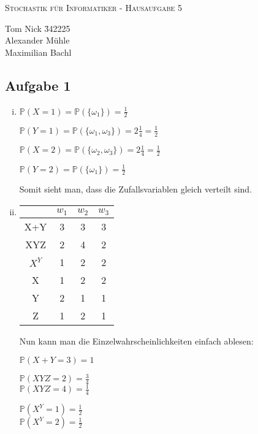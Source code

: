 \documentclass[10pt,a4paper,parskip=half]{scrartcl}
\begin{document}
\begin{center}
\textsc{\Large{Stochastik für Informatiker - Hausaufgabe 5}} \\
\end{center}
\begin{tabbing}
Tom Nick \hspace{1.4cm}\= 342225\\
Alexander Mühle\\
Maximilian Bachl
\end{tabbing}
\subsection*{Aufgabe 1}

\begin{enumerate}[(i)]
\item $\mathbb P (X=1) = \mathbb P(\{\omega_1\}) = \frac 1 2$

$\mathbb P (Y=1) = \mathbb P(\{\omega_1, \omega_3\}) = 2\frac 1 4 = \frac 1 2$

$\mathbb P (X=2) = \mathbb P(\{\omega_2, \omega_3\}) = 2\frac 1 4 = \frac 1 2$

$\mathbb P (Y=2) = \mathbb P(\{\omega_1\}) = \frac 1 2$

Somit sieht man, dass die Zufallsvariablen gleich verteilt sind.

\item\leavevmode\vadjust{\vspace{-\baselineskip}}\newline
\begin{tabular}{c | c c c}
& $w_1$ & $w_2$ & $w_3$ \\ \hline
X+Y & 3 & 3 & 3 \\
XYZ & 2 & 4 & 2 \\
$X^Y$ & 1 & 2 & 2 \\
X & 1 &2 &2 \\
Y & 2 &1 &1 \\
Z &1 &2 &1
\end{tabular}

Nun kann man die Einzelwahrscheinlichkeiten einfach ablesen:

$\mathbb P (X+Y = 3) = 1$

$\mathbb P (XYZ = 2) = \frac 3 4$\\
$\mathbb P (XYZ = 4) = \frac 1 4$

$\mathbb P (X^Y = 1) = \frac 1 2$\\
$\mathbb P (X^Y = 2) = \frac 1 2$

\end{enumerate}
\end{document}
